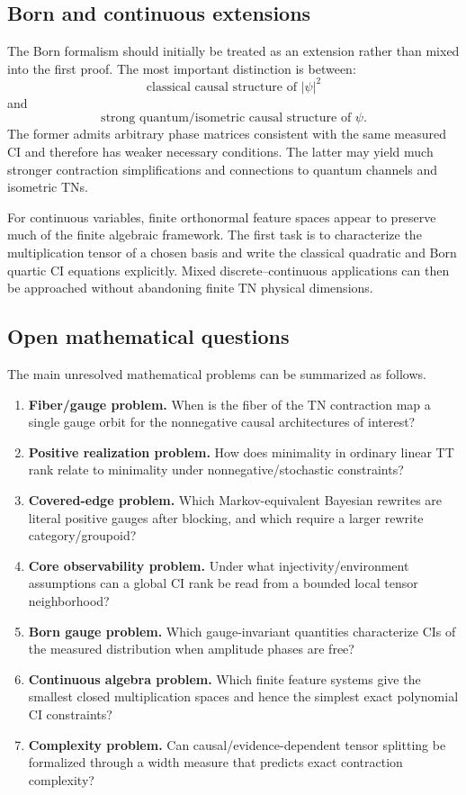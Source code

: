 \documentclass[11pt]{article}
\theoremstyle{remark}
\begin{document}
\subsection{Born and continuous extensions}

The Born formalism should initially be treated as an extension rather than mixed into the first proof. The most important distinction is between:
\begin{equation}
\boxed{\text{classical causal structure of }|\psi|^2}
\end{equation}
and
\begin{equation}
\boxed{\text{strong quantum/isometric causal structure of }\psi.}
\end{equation}
The former admits arbitrary phase matrices consistent with the same measured CI and therefore has weaker necessary conditions. The latter may yield much stronger contraction simplifications and connections to quantum channels and isometric TNs.

For continuous variables, finite orthonormal feature spaces appear to preserve much of the finite algebraic framework. The first task is to characterize the multiplication tensor of a chosen basis and write the classical quadratic and Born quartic CI equations explicitly. Mixed discrete--continuous applications can then be approached without abandoning finite TN physical dimensions.

\subsection{Open mathematical questions}

The main unresolved mathematical problems can be summarized as follows.
\begin{enumerate}
\item \textbf{Fiber/gauge problem.} When is the fiber of the TN contraction map a single gauge orbit for the nonnegative causal architectures of interest?
\item \textbf{Positive realization problem.} How does minimality in ordinary linear TT rank relate to minimality under nonnegative/stochastic constraints?
\item \textbf{Covered-edge problem.} Which Markov-equivalent Bayesian rewrites are literal positive gauges after blocking, and which require a larger rewrite category/groupoid?
\item \textbf{Core observability problem.} Under what injectivity/environment assumptions can a global CI rank be read from a bounded local tensor neighborhood?
\item \textbf{Born gauge problem.} Which gauge-invariant quantities characterize CIs of the measured distribution when amplitude phases are free?
\item \textbf{Continuous algebra problem.} Which finite feature systems give the smallest closed multiplication spaces and hence the simplest exact polynomial CI constraints?
\item \textbf{Complexity problem.} Can causal/evidence-dependent tensor splitting be formalized through a width measure that predicts exact contraction complexity?
\end{enumerate}
\end{document}
